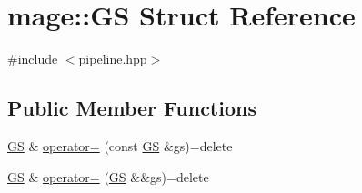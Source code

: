 \hypertarget{structmage_1_1_g_s}{}\section{mage\+:\+:GS Struct Reference}
\label{structmage_1_1_g_s}


{\ttfamily \#include $<$pipeline.\+hpp$>$}

\subsection*{Public Member Functions}
\begin{DoxyCompactItemize}
\item 
\hyperlink{structmage_1_1_g_s}{GS} \& \hyperlink{structmage_1_1_g_s_a2f52c4f0985ce99a5eec0afc3f484815}{operator=} (const \hyperlink{structmage_1_1_g_s}{GS} \&gs)=delete
\item 
\hyperlink{structmage_1_1_g_s}{GS} \& \hyperlink{structmage_1_1_g_s_a699e95852119b0e3f73ad4fbbac26332}{operator=} (\hyperlink{structmage_1_1_g_s}{GS} \&\&gs)=delete
\end{DoxyCompactItemize}
